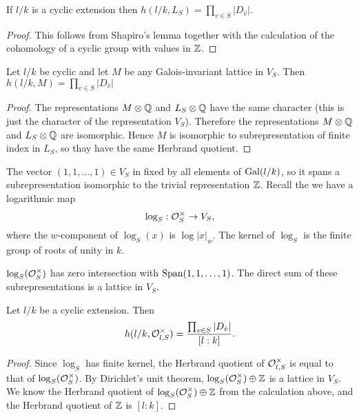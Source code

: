 \begin{lemma}
	If $l/k$ is a cyclic extension then
	$h(l/k,L_S) = \prod_{v \in S} |D_{\hat v}|$.
\end{lemma}

\begin{proof}
	This follows from Shapiro's lemma together with
	the calculation of the cohomology of a cyclic group with values in ${\mathbb Z}$.
\end{proof}

\begin{lemma}
	Let $l/k$ be cyclic and let $M$ be any Galois-invariant lattice in $V_S$.
	Then $h(l/k,M) = \prod_{v \in S} |D_{\hat v}|$
\end{lemma}

\begin{proof}
	The representations $M \otimes {\mathbb Q}$ and $L_S \otimes {\mathbb Q}$ have the same character
	(this is just the character of the representation $V_S$).
	Therefore the representations $M \otimes {\mathbb Q}$ and $L_S \otimes {\mathbb Q}$ are isomorphic.
	Hence $M$ is isomorphic to subrepresentation of finite index in $L_S$,
	so thay have the same Herbrand quotient.
\end{proof}


The vector $(1,1,\ldots,1) \in V_S$ in fixed by all elements of $\mathrm{Gal}(l/k)$, so it spans
a subrepresentation isomorphic to the trivial representation ${\mathbb Z}$.
Recall the we have a logarithmic map
\[
	\log_S : {\mathcal O}_S^\times \to V_S,
\]
where the $w$-component of $\log_S(x)$ is $\log |x|_w$.
The kernel of $\log_S$ is the finite group of roots of unity in $k$.

\begin{theorem} \label{thm:Dirichlet unit theorem}
	$\log_S({\mathcal O}_S^\times)$ has zero intersection with $\mathrm{Span} (1,1,\ldots,1)$.
	The direct sum of these subrepresentations is a lattice in $V_S$.
\end{theorem}

\begin{corollary}
	Let $l/k$ be a cyclic extension. Then
	\[
		h(l/k,{\mathcal O}_{l,S}^\times) = \frac{\prod_{v\in S} |D_{\hat v}|}{[l:k]}.
	\]
\end{corollary}

\begin{proof}
	Since $\log_S$ has finite kernel, the Herbrand quotient of ${\mathcal O}_{l,S}^\times$ is
	equal to that of $\log_S({\mathcal O}_S^\times)$.
	By Dirichlet's unit theorem, $\log_S({\mathcal O}_S^\times) \oplus {\mathbb Z}$ is a lattice in
	$V_S$.
	We know the Herbrand quotient of $\log_S({\mathcal O}_S^\times) \oplus {\mathbb Z}$ from the calculation above,
	and the Herbrand quotient of ${\mathbb Z}$ is $[l:k]$.
\end{proof}

